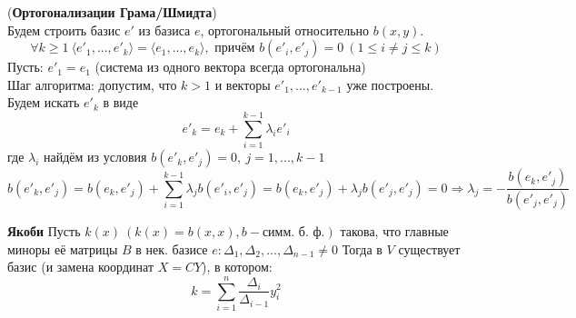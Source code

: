 \begin{algorithm}(\textbf{Ортогонализации Грама/Шмидта})\\
    Будем строить базис $e'$ из базиса $e$, ортогональный относительно $b(x, y)$.
    $$\forall k \geq 1 \ \langle e'_1,...,e'_k\rangle = \langle e_1,...,e_k\rangle, \text{ причём } b(e'_i, e'_j) = 0 \ (1 \leq i \neq j \leq k)$$
    Пусть: $e'_1 = e_1$ (система из одного вектора всегда ортогональна)\\
    Шаг алгоритма: допустим, что $k > 1$ и векторы $e'_1,...,e'_{k-1}$ уже построены. Будем искать $e'_{k}$ в виде 
    $$e'_k = e_k + \sum \limits_{i=1}^{k-1} \lambda_i e'_i$$
    где $\lambda_i$  найдём из условия $b(e'_k, e'_j) = 0, \ j = 1,...,k-1$
    $$b(e'_k, e'_j) = b(e_k, e'_j) + \sum \limits_{i=1}^{k-1} \lambda_j b(e'_i, e'_j) = b(e_k, e'_j) + \lambda_j b(e'_j, e'_j) = 0 \Rightarrow \lambda_j = -\frac{b(e_k, e'_j)}{b(e'_j, e'_j)}$$
\end{algorithm}
\begin{theorem} \textbf{Якоби}
    Пусть $k(x) \ (k(x)=b(x, x), b - \text{симм. б. ф.})$ такова, что главные миноры её матрицы $B$ в нек. базисе $e: \Delta_1,\Delta_2,...,\Delta_{n-1} \neq 0$
    Тогда в $V$ существует базис (и замена координат $X = CY$), в котором:
    $$k = \sum \limits_{i=1}^{n} \frac{\Delta_i}{\Delta_{i-1}}y_i^2$$
\end{theorem}
